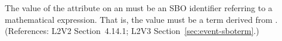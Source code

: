 The value of the  attribute on an \Event must be an SBO
identifier referring to a mathematical expression.  That is, the value must
be a term derived from \sboevent.  (References: L2V2 Section~4.14.1; L2V3
Section~\ref{sec:event-sboterm}.)
